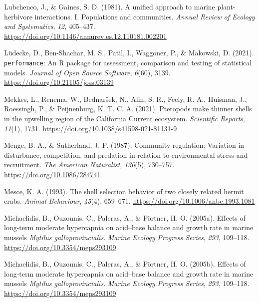 \documentclass{CSUNthesis}
\begin{document}
\vspace{0.1em}

Lubchenco, J., \& Gaines, S. D. (1981). A unified approach to marine plant-herbivore interactions. I. Populations and communities. \textit{Annual Review of Ecology and Systematics}, \textit{12}, 405--437. \url{https://doi.org/10.1146/annurev.es.12.110181.002201}

\vspace{0.1em}

Lüdecke, D., Ben-Shachar, M. S., Patil, I., Waggoner, P., \& Makowski, D. (2021). \texttt{performance}: An R package for assessment, comparison and testing of statistical models. \textit{Journal of Open Source Software}, \textit{6}(60), 3139. \url{https://doi.org/10.21105/joss.03139}

\vspace{0.1em}

Mekkes, L., Renema, W., Bednaršek, N., Alin, S. R., Feely, R. A., Huisman, J., Roessingh, P., \& Peijnenburg, K. T. C. A. (2021). Pteropods make thinner shells in the upwelling region of the California Current ecosystem. \textit{Scientific Reports}, \textit{11}(1), 1731. \url{https://doi.org/10.1038/s41598-021-81131-9}

\vspace{0.1em}

Menge, B. A., \& Sutherland, J. P. (1987). Community regulation: Variation in disturbance, competition, and predation in relation to environmental stress and recruitment. \textit{The American Naturalist}, \textit{130}(5), 730--757. \url{https://doi.org/10.1086/284741}

\vspace{0.1em}

Mesce, K. A. (1993). The shell selection behavior of two closely related hermit crabs. \textit{Animal Behaviour}, \textit{45}(4), 659--671. \url{https://doi.org/10.1006/anbe.1993.1081}

\vspace{0.1em}

Michaelidis, B., Ouzounis, C., Paleras, A., \& Pörtner, H. O. (2005a). Effects of long-term moderate hypercapnia on acid--base balance and growth rate in marine mussels \textit{Mytilus galloprovincialis}. \textit{Marine Ecology Progress Series}, \textit{293}, 109--118. \url{https://doi.org/10.3354/meps293109}

\vspace{0.1em}

Michaelidis, B., Ouzounis, C., Paleras, A., \& Pörtner, H. O. (2005b). Effects of long-term moderate hypercapnia on acid--base balance and growth rate in marine mussels \textit{Mytilus galloprovincialis}. \textit{Marine Ecology Progress Series}, \textit{293}, 109--118. \url{https://doi.org/10.3354/meps293109}
\end{document}
